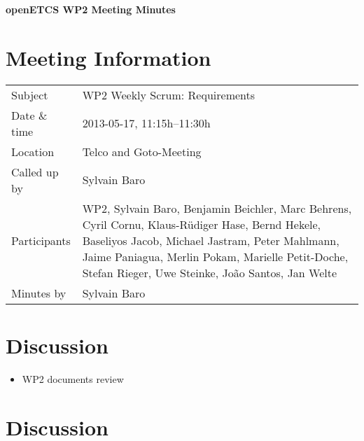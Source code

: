 \documentclass[a4paper, 11pt]{article}
\begin{document}
{\begin{center}\huge\bf openETCS WP2 Meeting Minutes\end{center}}
\section{Meeting Information}

\renewcommand{\arraystretch}{1.5}
\begin{supertabular}{m{.2\textwidth}m{.8\textwidth}}
Subject & WP2 Weekly Scrum: Requirements\\
Date \& time & 2013-05-17, 11:15h--11:30h\\
Location & Telco and Goto-Meeting\\
Called up by & Sylvain Baro\\
Participants & WP2,
Sylvain Baro,
Benjamin Beichler,
Marc Behrens,
Cyril Cornu, 
Klaus-R\"udiger Hase,
Bernd Hekele,
Baseliyos Jacob,
Michael Jastram, 
Peter Mahlmann, 
Jaime Paniagua,
Merlin Pokam,
Marielle Petit-Doche, 
Stefan Rieger,
Uwe Steinke,
Jo\~ao Santos,
Jan Welte\\

Minutes by & Sylvain Baro\\

\end{supertabular}
\renewcommand{\arraystretch}{1.0}


\section{{Discussion}}

\begin{itemize}
\item WP2 documents review
\end{itemize}

\section{{Discussion}}
\end{document}
